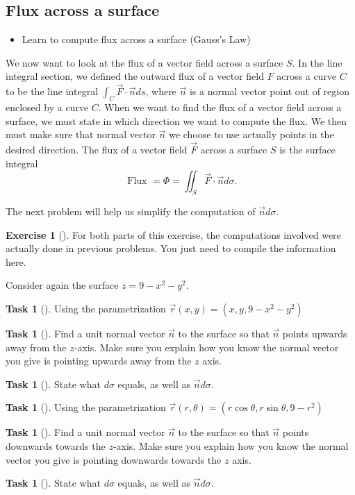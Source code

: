 \documentclass[10pt,]{book}
\theoremstyle{plain}
\theoremstyle{definition}
\theoremstyle{definition}
\theoremstyle{definition}
\theoremstyle{definition}
\newtheorem{exploration}[project]{Exercise}
\newtheorem{task}[project]{Task}
\theoremstyle{definition}
\numberwithin{equation}{section}
\newcommand{\ds}{\displaystyle}
\begin{document}
\subsection[{Flux across a surface}]{Flux across a surface}\label{subsection-35}
\leavevmode%
\begin{itemize}[label=\textbullet]
\item{}Learn to compute flux across a surface (Gauss's Law)%
\end{itemize}
We now want to look at the flux of a vector field across a surface \(S\). In the line integral section, we defined the outward flux of a vector field \(F\) across a curve \(C\) to be the line integral \(\ds \int_C \vec F\cdot \vec n ds\), where \(\vec n\) is a normal vector point out of region enclosed by a curve \(C\). When we want to find the flux of a vector field across a surface, we must state in which direction we want to compute the flux. We then must make sure that normal vector \(\vec n\) we choose to use actually points in the desired direction. The flux of a vector field \(\vec F\) across a surface \(S\) is the surface integral%
\begin{equation*}
\text{ Flux } =\Phi 
= \iint_S \vec F\cdot \vec n d\sigma 
.
\end{equation*}
%
\par
The next problem will help us simplify the computation of \(\vec nd\sigma\).%
\begin{exploration}[]\label{exploration-283}
For both parts of this exercise, the computations involved were actually done in previous problems. You just need to compile the information here.%
\par
Consider again the surface \(z=9-x^2-y^2\).%
\begin{task}[]\label{task-766}
Using the parametrization \(\vec r(x,y) =(x,y,9-x^2-y^2)\)%
\begin{task}[]\label{task-767}
Find a unit normal vector \(\vec n\) to the surface so that \(\vec n\) points upwards away from the \(z\)-axis. Make sure you explain how you know the normal vector you give is pointing upwards away from the \(z\) axis.%
\end{task}
\begin{task}[]\label{task-768}
State what \(d\sigma\) equals, as well as \(\vec n d\sigma\).%
\end{task}
\end{task}
\begin{task}[]\label{task-769}
Using the parametrization \(\vec r(r,\theta) =(r\cos \theta,r\sin\theta ,9-r^2)\)%
\begin{task}[]\label{task-770}
Find a unit normal vector \(\vec n\) to the surface so that \(\vec n\) points downwards towards the \(z\)-axis. Make sure you explain how you know the normal vector you give is pointing downwards towards the \(z\) axis.%
\end{task}
\begin{task}[]\label{task-771}
State what \(d\sigma\) equals, as well as \(\vec n d\sigma\).%
\end{task}
\end{task}
\end{exploration}
\end{document}
